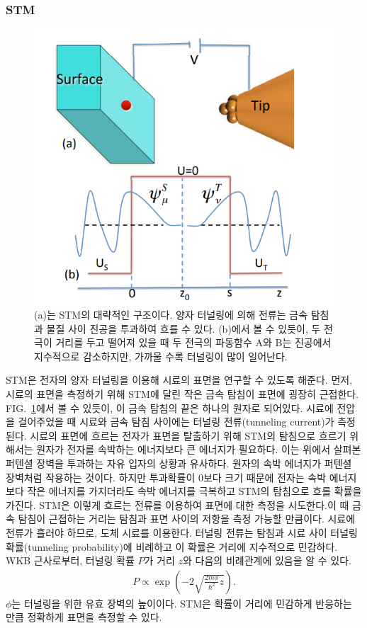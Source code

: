 \documentclass[aps,reprint,superscriptaddress,11pt]{revtex4-2}
\begin{document}
\subsubsection{STM}
\begin{figure}[htp]
  \centering
  \includegraphics[scale=0.35]{STM.png}
  \caption{(a)는 STM의 대략적인 구조이다. 
  양자 터널링에 의해 전류는 금속 탐침과 물질 사이 진공을 투과하여 흐를 수 있다.
  (b)에서 볼 수 있듯이, 두 전극이 거리를 두고 떨어져 있을 때 두 전극의 파동함수 A와 B는
  진공에서 지수적으로 감소하지만, 가까울 수록 터널링이 많이 일어난다.}
  \label{fig:2}
\end{figure}
STM은 전자의 양자 터널링을 이용해 시료의 표면을 연구할 수 있도록 해준다.
먼저, 시료의 표면을 측정하기 위해 STM에 달린 작은 금속 탐침이 표면에 굉장히 근접한다. 
FIG.~\ref{fig:2}에서 볼 수 있듯이, 이 금속 탐침의 끝은 하나의 원자로 되어있다. 
시료에 전압을 걸어주었을 때 시료와 금속 탐침 사이에는 터널링 전류(tunneling current)가 
측정된다. 시료의 표면에 흐르는 전자가 표면을 탈출하기 위해 STM의 탐침으로 흐르기 위해서는 
원자가 전자를 속박하는 에너지보다 큰 에너지가 필요하다. 이는 위에서 살펴본 퍼텐셜 장벽을 
투과하는 자유 입자의 상황과 유사하다. 원자의 속박 에너지가 퍼텐셜 장벽처럼 작용하는 것이다. 
하지만 투과확률이 $0$보다 크기 때문에 전자는 속박 에너지보다 작은 에너지를 가지더라도 속박 
에너지를 극복하고 STM의 탐침으로 흐를 확률을 가진다. STM은 이렇게 흐르는 전류를 이용하여 
표면에 대한 측정을 시도한다.이 때 금속 탐침이 근접하는 거리는 탐침과 표면 사이의 저항을 측정 
가능할 만큼이다. 시료에 전류가 흘러야 하므로, 도체 시료를 이용한다. 터널링 전류는 탐침과 시료 
사이 터널링 확률(tunneling probability)에 비례하고 이 확률은 거리에 지수적으로 민감하다. 
WKB 근사로부터, 터널링 확률 $P$가 거리 $z$와 다음의 비례관계에 있음을 알 수 있다.
\begin{align}
   P \propto \exp\left(-2\sqrt{\frac{2m\phi}{\hbar^2}z}\right).
\end{align}
$\phi$는 터널링을 위한 유효 장벽의 높이이다. STM은 확률이 거리에 민감하게 반응하는 만큼
정확하게 표면을 측정할 수 있다.
\end{document}
